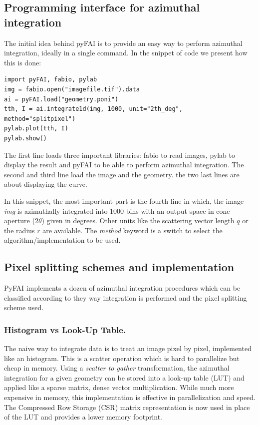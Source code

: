 \documentclass[preprint]{iucr}
\begin{document}
\subsection{Programming interface for azimuthal integration}

The initial idea behind pyFAI is to provide an easy way to perform azimuthal
integration, ideally in a single command. In the snippet of code we present how
this is done:

\begin{verbatim}
import pyFAI, fabio, pylab
img = fabio.open("imagefile.tif").data
ai = pyFAI.load("geometry.poni")
tth, I = ai.integrate1d(img, 1000, unit="2th_deg", method="splitpixel")
pylab.plot(tth, I)
pylab.show()
\end{verbatim}

The first line loads three important libraries: fabio \cite{fabio} to read
images, pylab \cite{matplotlib} to display the result and pyFAI to be able to
perform azimuthal integration.
The second and third line load the image and the geometry.
the two last lines are about displaying the curve.

In this snippet, the most important part is the fourth line in which, the image
\textit{img} is azimuthally integrated into 1000 bins with an output space in
cone aperture ($2\theta$) given in degrees. Other
units like the scattering vector length $q$ or the radius $r$ are available.
The \textit{method} keyword is a switch to select the algorithm/implementation
to be used.

\subsection{Pixel splitting schemes and implementation}

PyFAI implements a dozen of azimuthal integration procedures which can be
classified according to they way integration is performed and the pixel
splitting scheme used.

\subsubsection{Histogram vs Look-Up Table.}
The naive way to integrate data is to treat an image pixel by pixel,
implemented like an histogram. This is a scatter operation which is hard to
parallelize but cheap in memory.
Using a \textit{scatter to gather} transformation, the azimuthal integration for
a given geometry can be stored into a look-up table (LUT) and applied like a
sparse matrix, dense vector multiplication.
While much more expensive in memory, this
implementation is effective in parallelization and speed.
The Compressed Row Storage (CSR) matrix representation is now used in place of
the LUT and provides a lower memory footprint.
\end{document}
